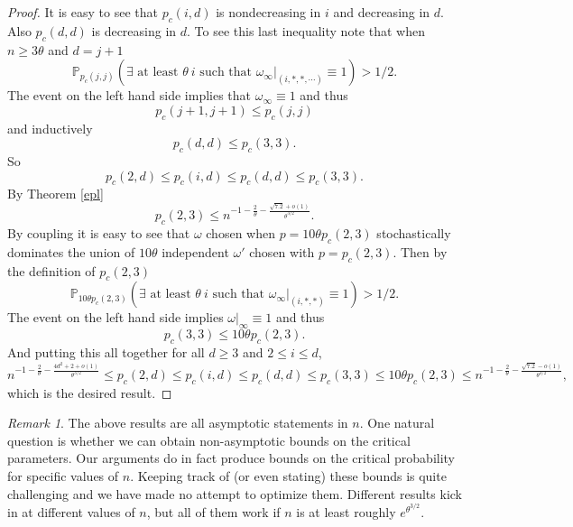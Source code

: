 \documentclass{amsart}
\newcommand{\prob}{\mathbb{P}}
\newcommand{\threshold}{\theta}
\numberwithin{equation}{section}
\theoremstyle{definition}
\theoremstyle{remark}
\newtheorem{remark}[theorem]{Remark}
\begin{document}
\begin{proof}
It is easy to see that 
$p_c(i,d)$ is nondecreasing in $i$ and decreasing in $d$. Also 
$p_c(d,d)$ is decreasing in $d$. To see this last inequality note that 
when $n \geq 3 \threshold$ and $d=j+1$
$$\prob_{ p_c(j,j)} (\exists \text{ at least }  \threshold \ i \text{ such that 
$\omega_\infty|_{(i,*,*, \cdots )}\equiv1$})>1/2.
$$
The event on the left hand side implies that $\omega_\infty\equiv1$ and 
thus 
$$p_c(j+1,j+1)\leq p_c(j,j)$$ 
and inductively
$$p_c(d,d) \leq p_c(3,3).$$ 
So 
$$p_c(2,d) \leq p_c(i,d) \leq p_c(d,d) \leq p_c(3,3) .$$
By Theorem \ref{epl}
$$p_c(2,3) \leq
n^{-1 - \frac{2}{\threshold} - \frac{\sqrt{7.2}+o(1)}{\threshold^{3/2}}}.
$$
By coupling it is easy to see that $\omega$ chosen when $p=10 \threshold p_c(2,3)$ stochastically dominates the union of $10 \threshold$ independent $\omega'$ 
chosen with $p=p_c(2,3)$. Then by the definition of $p_c(2,3)$
$$\prob_{10 \threshold p_c(2,3)} (\exists \text{ at least } \threshold \ i \text{ such that 
$\omega_\infty|_{(i,*,*)}\equiv 1$})>1/2.
$$
The event on the left hand side implies $\omega|_{\infty}\equiv1$ and thus 
\begin{equation}\label{cloudforestcafe}
p_c(3,3) \leq 10 \threshold p_c(2,3).
\end{equation}
And putting this all together for all $d \geq 3$ and $2 \leq i \leq d$,
$$n^{-1 - \frac{2}{\threshold} - \frac{4d^2+2+o(1)}{\threshold^{3/2}}} \leq
p_c(2,d) \leq p_c(i,d) \leq p_c(d,d) \leq p_c(3,3) \leq 10 \threshold p_c(2,3) \leq
n^{-1 - \frac{2}{\threshold} - \frac{\sqrt{7.2}-o(1)}{\threshold^{3/2}}},
$$
which is the desired result.
\end{proof}


\begin{remark} The above results are all asymptotic statements in $n$. One natural question is whether we can obtain non-asymptotic bounds on the critical parameters.  Our arguments do in fact produce bounds on the critical probability for specific values of $n$.  Keeping track of (or even stating) these bounds is quite challenging and we have made no attempt to optimize them. Different results kick in at different values of $n$, but all of them 
work if  $n$ is at least roughly $e^{\threshold^{3/2}}$. 
\end{remark}

\begin{comment}
\begin{remark}The above theorems hold for $n$ sufficiently large. We could calculate how large $n$ needs to be. Doing so involves a close look at the constants in the following sections. These constants depend on $\threshold$. In order to get the all the proofs to work we must choose $n$ to be roughly $e^{\threshold^{3/2}}$. As our calculations were optimized for ease of calculation, not to get the best possible bounds, we do not worry about for exactly which values of $n$ our theorems apply.
\end{remark}
\end{comment}
\end{document}
